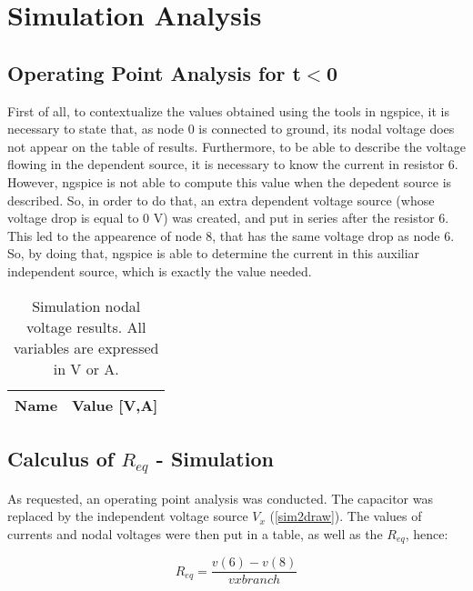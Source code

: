 \section{Simulation Analysis}\label{section:sim}

\subsection{Operating Point Analysis for t$<$0}

First of all, to contextualize the values obtained using the tools in ngspice, it is necessary to state that, as node 0 is connected to ground, its nodal voltage does not appear on the table of results. Furthermore, to be able to describe the voltage flowing in the dependent source, it is necessary to know the current in resistor 6. However, ngspice is not able to compute this value when the depedent source is described. So, in order to do that, an extra dependent voltage source (whose voltage drop is equal to 0 V) was created, and put in series after the resistor 6. This led to the appearence of node 8, that has the same voltage drop as node 6. So, by doing that, ngspice is able to determine the current in this auxiliar independent source, which is exactly the value needed.



\begin{table}[ht]

  \centering
  \begin{tabular}{|l|r|}
    \hline    
    {\bf Name} & {\bf Value [V,A]} \\ \hline
    
  \end{tabular}
  \caption{Simulation nodal voltage results. All variables are expressed in V or A.} 
\end{table}



\subsection{Calculus of $R_{eq}$ - Simulation}
As requested, an operating point analysis was conducted. The capacitor was replaced by the independent voltage source $V_{x}$ (\ref{sim2draw}). The values of currents and nodal voltages  were then put in a table, as well as the $R_{eq}$, hence:

\begin{equation}
R_{eq}=\frac{v(6)-v(8)}{vxbranch}
\label{eq:4}
\end{equation}

